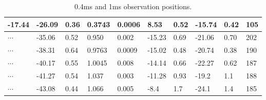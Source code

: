 \documentclass[useAMS,usenatbib]{mn2e}
\begin{document}
\begin{table}
\begin{tabular}{llllllllll}
-17.44   &-26.09                            & 0.36      & 0.3743 & 0.0006         & 8.53    & 0.52                                     & -15.74    & 0.42      &105                               
\\ \hline 
 $\cdots$ &       -35.06                           & 0.52                               & 0.950               & 0.002                              & -15.23  & 0.69                                     & -21.06   & 0.70   &202                                   \\

$\cdots$     & -38.31                           & 0.64                               & 0.9763              & 0.0009                             & -15.02  & 0.48                                    & -20.74   & 0.38  &190                                    \\

  $\cdots$  &-40.17                           & 0.55                               & 1.0045              & 0.008                             & -14.14  & 0.66                                    & -22.27   & 0.62  &187                                   \\

  $\cdots$ &-41.27                           & 0.54                               & 1.037              & 0.003                              & -11.28  & 0.93                                     & -19.2   & 1.1   &188                                   \\

$\cdots$ & -43.08                           & 0.44                               & 1.066              & 0.005                              & -8.4   & 1.7                                      & -24.1   & 1.4   &185   \\
 \hline                                 
\end{tabular}
\label{table:apex}
\caption{0.4ms and 1ms observation positions.}
\end{table}
\end{document}
